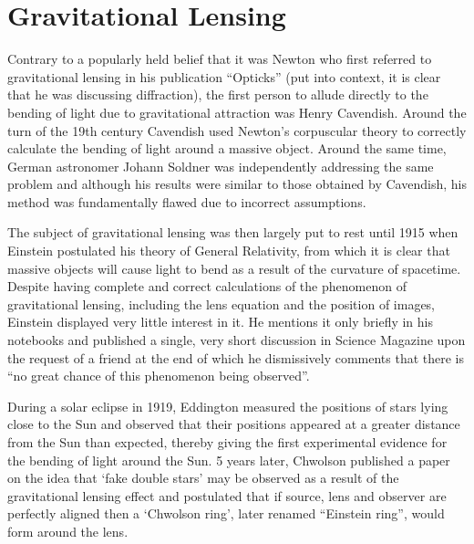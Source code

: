 
\section{Gravitational Lensing} %
\label{sec:gravitational_lensing}

		Contrary to a popularly held belief that it was Newton who first referred to gravitational lensing in his publication ``Opticks''\cite{Newton_Opticks} (put into context, it is clear that he was discussing diffraction), the first person to allude directly to the bending of light due to gravitational attraction was Henry Cavendish. Around the turn of the 19th century Cavendish used Newton's corpuscular theory to correctly calculate the bending of light around a massive object.  Around the same time, German astronomer Johann Soldner was independently addressing the same problem\cite{Soldner} and although his results were similar to those obtained by Cavendish, his method was fundamentally flawed due to incorrect assumptions\cite{Conceptual_origins_of_GL}.

		The subject of gravitational lensing was then largely put to rest until 1915 when Einstein postulated his theory of General Relativity, from which it is clear that massive objects will cause light to bend as a result of the curvature of spacetime. Despite having complete and correct calculations of the phenomenon of gravitational lensing, including the lens equation and the position of images, Einstein displayed very little interest in it. He mentions it only briefly in his notebooks and published a single, very short discussion in Science Magazine upon the request of a friend at the end of which he dismissively comments that there is ``no great chance of this phenomenon being observed''\cite{Einstein_science_magazine}.

		During a solar eclipse in 1919, Eddington measured the positions of stars lying close to the Sun and observed that their positions appeared at a greater distance from the Sun than expected, thereby giving the first experimental evidence for the bending of light around the Sun\cite{Eddington_GL_evidence}. 5 years later, Chwolson published a paper on the idea that `fake double stars' may be observed as a result of the gravitational lensing effect and postulated that if source, lens and observer are perfectly aligned then a `Chwolson ring', later renamed ``Einstein ring'', would form around the lens\cite{Conceptual_origins_of_GL}.

